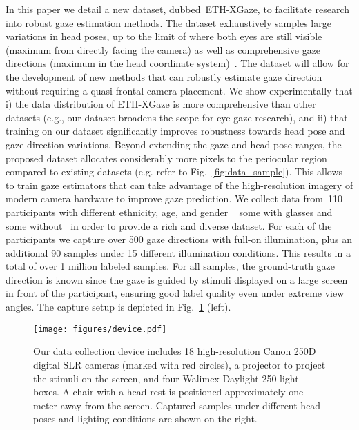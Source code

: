 \documentclass[runningheads]{llncs}
\newcommand{\datasetname}{ETH-XGaze\xspace}
\newcommand{\numparticipant}{110\xspace}
\begin{document}
In this paper we detail a new dataset, dubbed~\datasetname, to facilitate research into robust gaze estimation methods. The dataset exhaustively samples large variations in head poses, up to the limit of where both eyes are still visible (maximum  from directly facing the camera) as well as comprehensive gaze directions (maximum  in the head coordinate system)~\cite{ruch1960medical}.
The dataset will allow for the development of new methods that can robustly estimate gaze direction without requiring a quasi-frontal camera placement. We show experimentally that 
i) the data distribution of \datasetname is more comprehensive than other datasets 
(e.g., our dataset broadens the scope for eye-gaze research),
and ii) that training on our dataset significantly improves robustness towards head pose and gaze direction variations. 
Beyond extending the gaze and head-pose ranges, the proposed dataset allocates considerably more pixels to the periocular region compared to existing datasets (e.g. refer to Fig.~\ref{fig:data_sample}). This allows to train gaze estimators that can take advantage of the high-resolution imagery of modern camera hardware to improve gaze prediction. We collect data from~\numparticipant participants with different ethnicity, age, and gender \textendash~ some with glasses and some without \textendash~in order to provide a rich and diverse dataset. For each of the participants we capture over 500 gaze directions with full-on illumination, plus an additional 90 samples under 15 different illumination conditions. This results in a total of over 1 million labeled samples. For all samples, the ground-truth gaze direction is known since the gaze is guided by stimuli displayed on a large screen in front of the participant, ensuring good label quality even under extreme view angles.
The capture setup is depicted in Fig.~\ref{fig:device} (left).

\begin{figure}[t]
    \centering
    \texttt{[image: figures/device.pdf]}
    \caption{Our data collection device includes 18 high-resolution Canon 250D digital SLR cameras (marked with red circles), a projector to project the stimuli on the screen, and four Walimex Daylight 250 light boxes. A chair with a head rest is positioned approximately one meter away from the screen. Captured samples under different head poses and lighting conditions are shown on the right.}
    \label{fig:device}
\end{figure}
\end{document}
